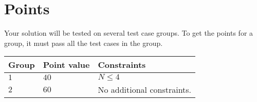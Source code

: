\section*{Points}
Your solution will be tested on several test case groups.
To get the points for a group, it must pass all the test cases in the group.

\noindent
\begin{tabular}{| l | l | p{12cm} |}
  \hline
  \textbf{Group} & \textbf{Point value} & \textbf{Constraints} \\ \hline
  $1$    & $40$      & $N \leq 4$ \\ \hline
  $2$    & $60$        & No additional constraints. \\ \hline
\end{tabular}